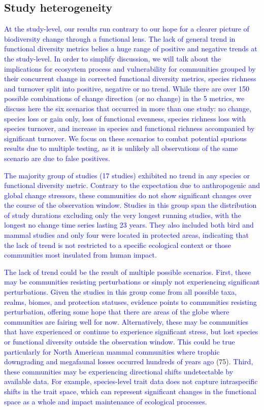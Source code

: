 \documentclass{article}
\begin{document}
\hypertarget{study-heterogeneity}{%
\subsection{Study heterogeneity}\label{study-heterogeneity}}

\textcolor{blue}{At the study-level, our results run contrary to our hope for a clearer picture of biodiversity change through a functional lens. The lack of general trend in functional diversity metrics belies a huge range of positive and negative trends at the study-level. In order to simplify discussion, we will talk about the implications for ecosystem process and vulnerability for communities grouped by their concurrent change in corrected functional diversity metrics, species richness and turnover split into positive, negative or no trend. While there are over 150 possible combinations of change direction (or no change) in the 5 metrics, we discuss here the six scenarios that occurred in more than one study: no change, species loss or gain only, loss of functional evenness, species richness loss with species turnover, and increase in species and functional richness accompanied by significant turnover. We focus on these scenarios to combat potential spurious results due to multiple testing, as it is unlikely all observations of the same scenario are due to false positives.}

\textcolor{blue}{The majority group of studies (17 studies) exhibited no trend in any species or functional diversity metric. Contrary to the expectation due to anthropogenic and global change stressors, these communities do not show significant changes over the course of the observation window. Studies in this group span the distribution of study durations excluding only the very longest running studies, with the longest no change time series lasting 23 years. They also included both bird and mammal studies and only four were located in protected areas, indicating that the lack of trend is not restricted to a specific ecological context or those communities most insulated from human impact.}

\textcolor{blue}{The lack of trend could be the result of multiple possible scenarios. First, these may be communities resisting perturbations or simply not experiencing significant perturbations. Given the studies in this group come from all possible taxa, realms, biomes, and protection statuses, evidence points to communities resisting perturbation, offering some hope that there are areas of the globe where communities are fairing well for now. Alternatively, these may be communities that have experienced or continue to experience significant stress, but lost species or functional diversity outside the observation window. This could be true particularly for North American mammal communities where trophic downgrading and megafaunal losses occurred hundreds of years ago }(75).
\textcolor{blue}{Third, these communities may be experiencing directional shifts undetectable by available data. For example, species-level trait data does not capture intraspecific shifts in the trait space, which can represent significant changes in the functional space as a whole and impact maintenance of ecological processes.}
\end{document}
